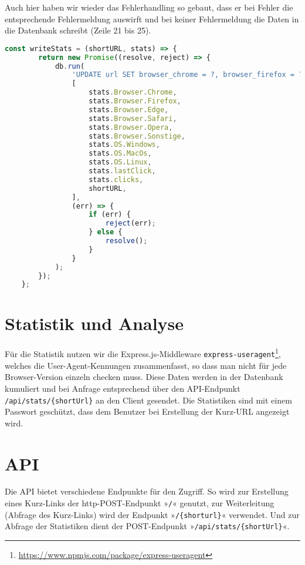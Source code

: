 \documentclass[a4paper,11pt,DIV=12,overfullrule=on]{scrreprt}%
\begin{document}
Auch hier haben wir wieder das Fehlerhandling so gebaut, dass er bei Fehler die entsprechende Fehlermeldung auswirft und bei keiner Fehlermeldung die Daten in die Datenbank schreibt (Zeile 21 bis 25).

\begin{lstlisting}[language=JavaScript,
    caption={Die Daten werden von der API an uns übermittelt und wir speichern die Daten in der Datenbank beim entsprechenden Kurzlink ab},
    label={lst:dbUpdate},
    float=h,
    gobble=4
]
    const writeStats = (shortURL, stats) => {
        return new Promise((resolve, reject) => {
            db.run(
                'UPDATE url SET browser_chrome = ?, browser_firefox = ?, browser_edge = ?, browser_safari = ?, browser_opera = ?, browser_sonstige = ?, os_win = ?, os_mac = ?, os_linux = ?, lastClick = ?, clicks = ? WHERE shortURL = ?',
                [
                    stats.Browser.Chrome,
                    stats.Browser.Firefox,
                    stats.Browser.Edge,
                    stats.Browser.Safari,
                    stats.Browser.Opera,
                    stats.Browser.Sonstige,
                    stats.OS.Windows,
                    stats.OS.MacOs,
                    stats.OS.Linux,
                    stats.lastClick,
                    stats.clicks,
                    shortURL,
                ],
                (err) => {
                    if (err) {
                        reject(err);
                    } else {
                        resolve();
                    }
                }
            );
        });
    };
\end{lstlisting}

\section{Statistik und Analyse}
Für die Statistik nutzen wir die Express.js-Middleware \texttt{express-useragent}\footnote{\href{https://www.npmjs.com/package/express-useragent}{https://www.npmjs.com/package/express-useragent}}, welches die User-Agent-Kennungen zusammenfasst, so dass man nicht für jede Browser-Version einzeln checken muss. Diese Daten werden in der Datenbank kumuliert und bei Anfrage entsprechend über den \ac{API}-Endpunkt \texttt{/api/stats/\{shortUrl\}} an den Client gesendet. Die Statistiken sind mit einem Passwort geschützt, dass dem Benutzer bei Erstellung der Kurz-URL angezeigt wird.

\section{API}
Die \ac{API} bietet verschiedene Endpunkte für den Zugriff. So wird zur Erstellung eines Kurz-Links der http-POST-Endpunkt »\texttt{/}« genutzt, zur Weiterleitung (Abfrage des Kurz-Links) wird der Endpunkt »\texttt{/\{shorturl\}}« verwendet. Und zur Abfrage der Statistiken dient der POST-Endpunkt »\texttt{/api/stats/\{shortUrl\}}«. 
\end{document}
